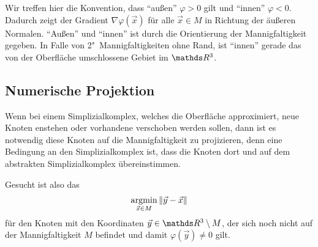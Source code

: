     Wir treffen hier die Konvention, dass "`außen"' \( \varphi > 0 \) gilt und "`innen"' \( \varphi < 0 \).
    Dadurch zeigt der Gradient \( \nabla\varphi(\vec{x}) \) für alle \( \vec{x}\in M \) in Richtung der äußeren Normalen.
    "`Außen"' und "`innen"' ist durch die Orientierung der Mannigfaltigkeit gegeben. 
    In Falle von 2"~Mannigfaltigkeiten ohne Rand, ist "`innen"' gerade das von der Oberfläche umschlossene Gebiet im \( \R^{3} \).

    \subsection{Numerische Projektion}
      \label{SubSubSecPhiProject}
      Wenn bei einem Simplizialkomplex, welches die Oberfläche approximiert, neue Knoten enstehen oder vorhandene verschoben werden sollen,
      dann ist es notwendig diese Knoten auf die Mannigfaltigkeit zu projizieren, 
      denn eine Bedingung an den Simplizialkomplex ist, dass die Knoten dort und auf dem abstrakten Simplizialkomplex übereinstimmen.

      Gesucht ist also das
      \begin{align}
        \argmin_{\vec{x}\in M} \|\vec{y} - \vec{x}\|
      \end{align}
      für den Knoten mit den Koordinaten \( \vec{y}\in\R^{3}\setminus M \), der sich noch nicht auf der Mannigfaltigkeit \( M \) befindet 
      und damit \( \varphi(\vec{y}) \neq 0 \) gilt.

